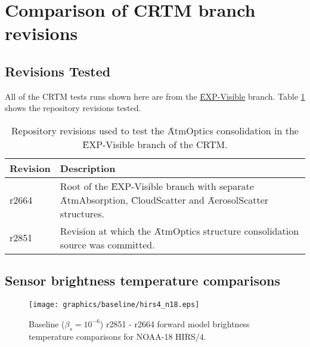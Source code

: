 \section{Comparison of CRTM branch revisions}

\subsection{Revisions Tested}
All of the CRTM tests runs shown here are from the \href{https://svn.ncep.noaa.gov/emc/crtm/branches/EXP-Visible}{\f{EXP-Visible}} branch. Table \ref{tab:revisions_tested} shows the repository revisions tested.

\begin{table}[htp]
  \centering
  \begin{tabular}{p{2cm} p{10cm}}
    \hline
    \sffamily\textbf{Revision} & \sffamily\textbf{Description}\\
    \hline\hline
    r2664 & Root of the \f{EXP-Visible} branch with separate \f{AtmAbsorption}, \f{CloudScatter} and \f{AerosolScatter} structures.\vspace{0.5em}\\
    r2851 & Revision at which the \f{AtmOptics} structure consolidation source was committed.\\
    \hline
  \end{tabular}
  \caption{Repository revisions used to test the \f{AtmOptics} consolidation in the \f{EXP-Visible} branch of the CRTM.}
  \label{tab:revisions_tested}
\end{table}

\subsection{Sensor brightness temperature comparisons}

\begin{figure}[htb]
  \centering
  \texttt{[image: graphics/baseline/hirs4\_n18.eps]}
  \caption{Baseline ($\beta_s = 10^{-6}$) r2851 - r2664 forward model brightness temperature comparisons for NOAA-18 HIRS/4.}
  \label{fig:baseline_hirs4_n18}
\end{figure}


